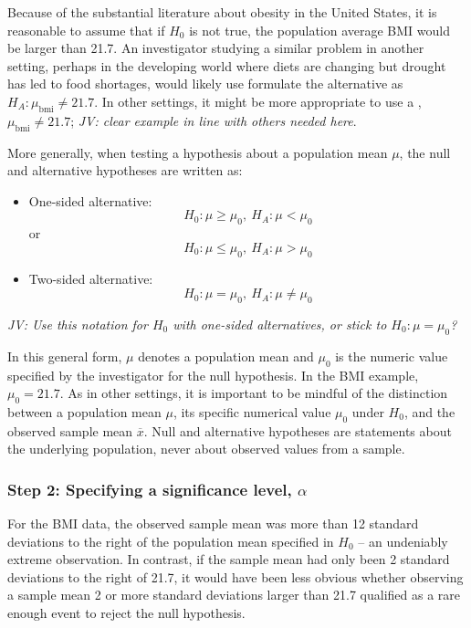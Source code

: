 \begin{spacing}{1.5}
 Because of the substantial literature about obesity in the United States, it is reasonable to assume that if $H_0$ is not true, the population average BMI would be larger than 21.7.  An investigator studying a similar problem in another setting, perhaps in the developing world where diets are changing but drought has led to food shortages, would likely use formulate the alternative as $ H_A:\mu_{\text{bmi}} \ne 21.7$. In other settings, it might be more appropriate to use a , $\mu_{\text{bmi}} \neq 21.7$; \textit{JV: clear example in line with others needed here}.

More generally, when testing a hypothesis about a population mean $\mu$, the null and alternative hypotheses are written as:

\begin{itemize}
	\item One-sided alternative: \[H_0: \mu \geq \mu_0, \ H_A: \mu < \mu_0\] or \[H_0: \mu \leq \mu_0, \  H_A: \mu > \mu_0\]
	
	\item Two-sided alternative: \[H_0: \mu = \mu_0, \ H_A: \mu \neq \mu_0\]
\end{itemize}

\textit{JV: Use this notation for $H_0$ with one-sided alternatives, or stick to $H_0: \mu = \mu_{0}$?}

In this general form, $\mu$ denotes a population mean and $\mu_0$ is the numeric value specified by the investigator for the null hypothesis. In the BMI example, $\mu_0 = 21.7$.  As in other settings, it is important to be mindful of the distinction between a population mean $\mu$, its specific numerical value $\mu_0$ under $H_0$,  and the observed sample mean $\overline{x}$.  Null and alternative hypotheses are statements about the underlying population, never about observed values from a sample.

\subsubsection{Step 2: Specifying a significance level, $\alpha$}

For the  BMI data, the observed sample mean was more than 12 standard deviations to the right of the population mean specified in $H_0$ -- an undeniably extreme observation. In contrast, if the sample mean had only been 2 standard deviations to the right of 21.7, it would have been less obvious whether observing a sample mean 2 or more standard deviations larger than 21.7 qualified as a rare enough event to reject the null hypothesis. 


\end{spacing}
